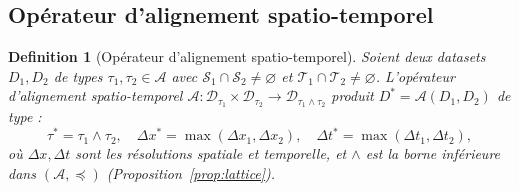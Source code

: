 \documentclass[12pt]{article}
\newtheorem{definition}{Definition}[section]
\begin{document}
\subsection{Opérateur d'alignement spatio-temporel}
\label{subsec:sta_formal}


\begin{definition}[Opérateur d'alignement spatio-temporel]
	\label{def:sta}
	Soient deux datasets $D_1, D_2$ de types $\tau_1, \tau_2 \in \mathcal{A}$
	avec $\mathcal{S}_1 \cap \mathcal{S}_2 \neq \varnothing$ et
	$\mathcal{T}_1 \cap \mathcal{T}_2 \neq \varnothing$.
	L'\emph{opérateur d'alignement spatio-temporel}
	$\mathcal{A} : \mathcal{D}_{\tau_1} \times \mathcal{D}_{\tau_2}
	\to \mathcal{D}_{\tau_1 \wedge \tau_2}$
	produit $D^* = \mathcal{A}(D_1, D_2)$ de type :
	\begin{equation}
		\tau^* = \tau_1 \wedge \tau_2,\quad
		\Delta x^* = \max(\Delta x_1, \Delta x_2),\quad
		\Delta t^* = \max(\Delta t_1, \Delta t_2),
		\label{eq:sta}
	\end{equation}
	où $\Delta x, \Delta t$ sont les résolutions spatiale et temporelle,
	et $\wedge$ est la borne inférieure dans $(\mathcal{A},\preceq)$
	(Proposition~\ref{prop:lattice}).
\end{definition}
\end{document}
